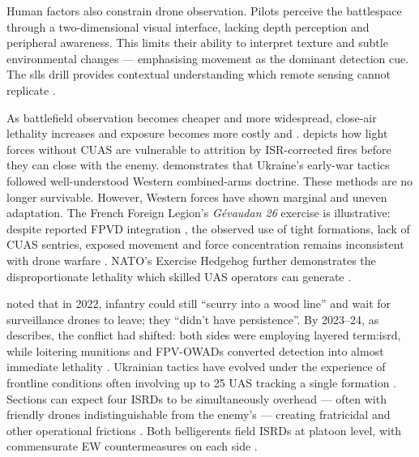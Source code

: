 Human factors also constrain drone observation. Pilots perceive the battlespace through a two-dimensional visual interface, lacking depth perception and peripheral awareness. This limits their ability to interpret texture and subtle environmental changes --- emphasising movement as the dominant detection cue. The \gls{slls} drill provides contextual understanding which remote sensing cannot replicate \parencite[4:35--5:32]{civdiv_6}.



As battlefield observation becomes cheaper and more widespread, close-air lethality increases and exposure becomes more costly \parencite[15]{hvizda_2025} and \parencite{neron_bancel_2024_05_27}. \textcite{SBS_Jan_2023_infinopen} depicts how light forces without CUAS are vulnerable to attrition by ISR-corrected fires before they can close with the enemy. \textcite{kraken_2022_12_30} demonstrates that Ukraine's early-war tactics followed well-understood Western combined-arms doctrine. These methods are no longer survivable. However, Western forces have shown marginal and uneven adaptation. The French Foreign Legion’s \textit{Gévaudan 26} exercise is illustrative: despite reported FPVD integration \parencite{ministere_des_armees_2026_gevaudan_26_legionnaires_combat}, the observed use of tight formations, lack of CUAS sentries, exposed movement and force concentration remains inconsistent with drone warfare \parencite{tf1_info_2026_legion_etrangere_entrainement}. NATO’s Exercise Hedgehog further demonstrates the disproportionate lethality which skilled UAS operators can generate \parencite{melchior_2026}. 

\textcite{darragh_participant_4} noted that in 2022, infantry could still ``scurry into a wood line'' and wait for surveillance drones to leave; they ``didn't have persistence''. By 2023--24, as \textcite{fred_participant_9} describes, the conflict had shifted: both sides were employing layered \gls{term:isrd}, while loitering munitions and FPV-OWADs converted detection into almost immediate lethality \parencite{bob_tollast_participant_12,JONES_2023,WATLING_2023A,WATLING_2024A,ZABRODSKYI_2022}. Ukrainian tactics have evolved under the experience of frontline conditions often involving up to 25 UAS tracking a single formation \parencite[32]{WATLING_2023B}. Sections can expect four ISRDs to be simultaneously overhead --- often with friendly drones indistinguishable from the enemy's --- creating fratricidal and other operational frictions \parencite{fred_participant_9}. Both belligerents field ISRDs at platoon level, with commensurate EW countermeasures on each side \parencite[14]{hvizda_2025}. 



